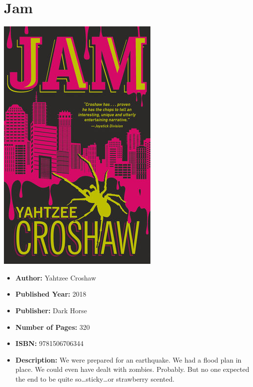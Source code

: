 \documentclass{tufte-handout}
\makeatletter
\newcommand{\varcaption}[2][0pt]{%
  \gsetlength{\@tufte@caption@vertical@offset}{-#1}%
  \gdef\@tufte@stored@varcaption{#2}%
}
\gdef\@tufte@stored@varcaption{} %
\makeatother
\begin{document}
\section*{Jam}
\begin{marginfigure}[\baselineskip]
   \includegraphics[width=\linewidth]{images/jam.jpg}
   \varcaption{\href{https://www.darkhorse.com/Books/18-937/JAM-novel}{Publisher Link}, \href{https://www.amazon.com/Jam-Yahtzee-Croshaw/dp/1506706347/}{Amazon Link}}
\end{marginfigure}

\begin{itemize}
    \item[] \textbf{Author:} Yahtzee Croshaw
    \item[] \textbf{Published Year:} 2018
    \item[] \textbf{Publisher:} Dark Horse
    \item[] \textbf{Number of Pages:} 320      
    \item[] \textbf{ISBN:} 9781506706344
    \item[] \textbf{Description:} We were prepared for an earthquake. We had a flood plan in place. We could even have dealt with zombies. Probably. But no one expected the end to be quite so\ldots sticky\ldots or strawberry scented.
\end{itemize}
\end{document}
